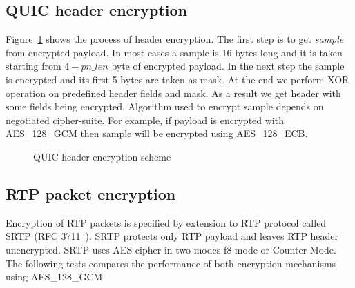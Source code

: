 \subsection{QUIC header encryption}
\label{subsec:quic-header-encryption}
Figure~\ref{fig:header_enc} shows the process of header encryption.
The first step is to get \textit{sample} from encrypted payload.
In most cases a sample is 16 bytes long and it is taken starting from $4 - pn\_len$ byte of encrypted payload.
In the next step the sample is encrypted and its first 5 bytes are taken as mask.
At the end we perform XOR operation on predefined header fields and mask.
As a result we get header with some fields being encrypted.
Algorithm used to encrypt sample depends on negotiated cipher-suite.
For example, if payload is encrypted with AES\_128\_GCM then sample will be encrypted using AES\_128\_ECB\@.

\begin{figure}[h]
    \centering
    \caption{QUIC header encryption scheme}
    \label{fig:header_enc}
\end{figure}

\subsection{RTP packet encryption}
\label{subsec:rtp-packet-encryption}
Encryption of RTP packets is specified by extension to RTP protocol called SRTP (RFC 3711~\cite{rfc3711}).
SRTP protects only RTP payload and leaves RTP header unencrypted.
SRTP uses AES cipher in two modes f8-mode or Counter Mode.
The following tests compares the performance of both encryption mechanisms using AES\_128\_GCM\@.

